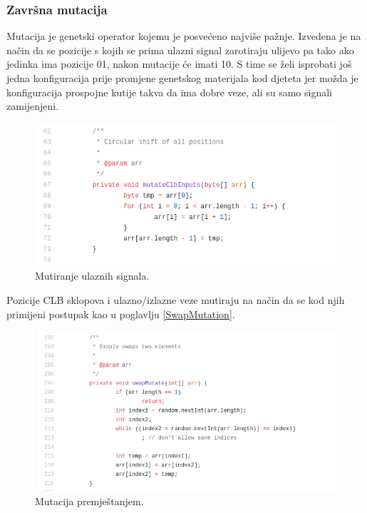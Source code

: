 \documentclass[times, utf8, zavrsni]{fer}
\begin{document}
	\subsubsection{Završna mutacija}
	\label{EndMutation}
	
	Mutacija je genetski operator kojemu je posvećeno najviše pažnje. Izvedena je na način da se pozicije s kojih se prima ulazni signal zarotiraju ulijevo pa tako ako jedinka ima pozicije 01, nakon mutacije će imati 10. S time se želi isprobati još jedna konfiguracija prije promjene genetskog materijala kod djeteta jer možda je konfiguracija prospojne kutije takva da ima dobre veze, ali su samo signali zamijenjeni.  
	
	\begin{figure}[H]
		\centering
		\includegraphics[width=18cm]{slike/circularShift.png}
		\caption{Mutiranje ulaznih signala.}
		\label{fig:sw-boxes-inputs-mutation}
	\end{figure} 
	
	Pozicije CLB sklopova i ulazno/izlazne veze mutiraju na način da se kod njih primijeni postupak kao u poglavlju \ref{SwapMutation}.
	
	\begin{figure}[H]
		\centering
		\includegraphics[width=18cm]{slike/swapMutate.png}
		\caption{Mutacija premještanjem. }
		\label{fig:sw-boxes-mutation}
	\end{figure} 
	
\end{document}
